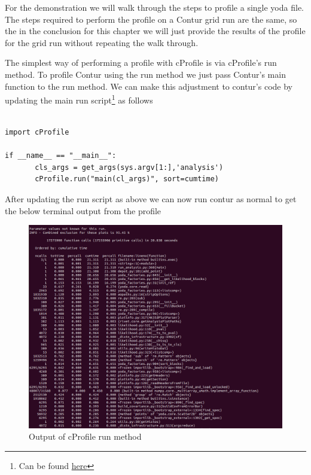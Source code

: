For the demonstration we will walk through the steps to profile a single yoda file. The steps required to perform the profile on a Contur grid run are the same, so the in the conclusion for this chapter we will just provide the results of the profile for the grid run without repeating the walk through.

The simplest way of performing a profile with cProfile is via cProfile's run method. To profile Contur using the run method we just pass Contur's main function to the run method. We can make this adjustment to contur's code by updating the main run script\footnote{Can be found \href{https://gitlab.com/hepcedar/contur/-/blob/main/bin/contur}{here}} as follows 

\begin{verbatim}

import cProfile

if __name__ == "__main__":
       cls_args = get_args(sys.argv[1:],'analysis')
       cProfile.run("main(cl_args)", sort=cumtime)

\end{verbatim}


After updating the run script as above we can now run contur as normal to get the below terminal output from the profile

\begin{figure}[H]
\centering
\includegraphics[scale=0.35]{plots/example_profile.png}
\caption{Output of cProfile run method}
\label{fig:ep}
\end{figure}


